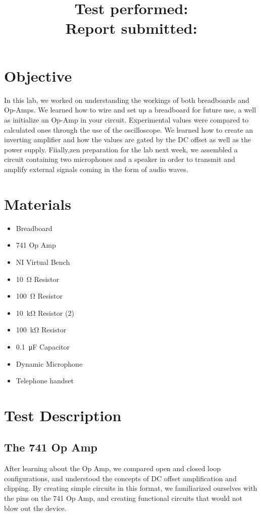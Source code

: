 \documentclass[10pt]{article}
\title{
    \textbf{\courseTitle} \\
    \textbf{\documentTitle} \\
    \bigskip
    \textbf{\large{Test performed: \testDate}} \\
    \textbf{\large{Report submitted: \reportDate}} \\
    \bigskip
    \bigskip
}
\author{\documentAuthor}
\date{}
\begin{document}
\maketitle

\newpage

\section{Objective}

In this lab, we worked on understanding the workings of both breadboards and Op-Amps. We learned how to wire and set up a breadboard for future use, a well as initialize an Op-Amp in your circuit. Experimental values were compared to calculated ones through the use of the oscilloscope. We learned how to create an inverting amplifier and how the values are gated by the DC offset as well as the power supply. Fiially,zen preparation for the lab next week, we assembled a circuit containing two microphones and a speaker in order to transmit and amplify external signals coming in the form of audio waves.

\section{Materials}
\begin{itemize}
	\item Breadboard
	\item 741 Op Amp
	\item NI Virtual Bench
	\item \SI{10}{\ohm} Resistor
	\item \SI{100}{\ohm} Resistor
	\item \SI{10}{\kilo\ohm} Resistor (2)
	\item \SI{100}{\kilo\ohm} Resistor
	\item \SI{.1}{\micro\farad} Capacitor
	\item Dynamic Microphone
	\item Telephone handset
\end{itemize}


\section{Test Description}
\subsection{The 741 Op Amp}
After learning about the Op Amp, we compared open and closed loop configurations, and understood the concepts of DC offset amplification and clipping. By creating simple circuits in this format, we familiarized ourselves with the pins on the 741 Op Amp, and creating functional circuits that would not blow out the device.
\end{document}
